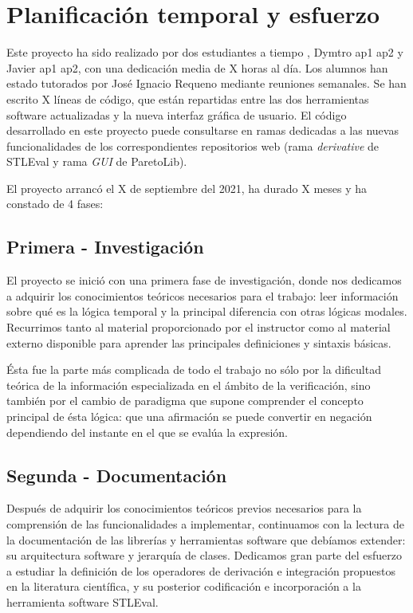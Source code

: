 \section{Planificación temporal y esfuerzo}

Este proyecto ha sido realizado por dos estudiantes a tiempo , Dymtro ap1 ap2 y Javier ap1 ap2, con una dedicación media de X horas al día. Los alumnos han estado tutorados por José Ignacio Requeno mediante reuniones semanales. Se han escrito X líneas de código, que están repartidas entre las dos herramientas software actualizadas y la nueva interfaz gráfica de usuario. El código desarrollado en este proyecto puede consultarse en ramas dedicadas a las nuevas funcionalidades de los correspondientes repositorios web (rama \textit{derivative} de STLEval y rama \textit{GUI} de ParetoLib).

El proyecto arrancó el X de septiembre del 2021, ha durado X meses y ha constado de 4 fases: 

\subsection{Primera - Investigación}
El proyecto se inició con una primera fase de investigación, donde nos dedicamos a adquirir los conocimientos teóricos necesarios para el trabajo: leer información sobre qué es la lógica temporal y la principal diferencia con otras lógicas modales. Recurrimos tanto al material proporcionado por el instructor como al material externo disponible para aprender las principales definiciones y sintaxis básicas. 

Ésta fue la parte más complicada de todo el trabajo no sólo por la dificultad teórica de la información especializada en el ámbito de la verificación, sino también por el cambio de paradigma que supone comprender el concepto principal de ésta lógica: que una afirmación se puede convertir en negación dependiendo del instante en el que se evalúa la expresión.
	
\subsection{Segunda - Documentación}

	Después de adquirir los conocimientos teóricos previos necesarios para la comprensión de las funcionalidades a implementar, continuamos con la lectura de la documentación de las librerías y herramientas software que debíamos extender: su arquitectura software y jerarquía de clases. Dedicamos gran parte del esfuerzo a estudiar la definición de los operadores de derivación e integración propuestos en la literatura científica, y su posterior codificación e incorporación a la herramienta software STLEval.
	
